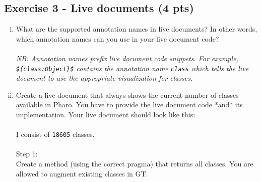 \documentclass [11pt, a4wide, twoside]{article}
\begin{document}
\subsection*{Exercise 3 - Live documents (4 pts)}
\begin{enumerate}[i)]
\item What are the supported annotation names in live documents? In other words, which annotation names can you use in your live document code?\\\\
\emph{NB: Annotation names prefix live document code snippets. For example, \texttt{\$\{class:Object\}\$} contains the annotation name \texttt{class} which tells the live document to use the appropriate visualization for classes.}
\item Create a live document that always shows the current number of classes available in Pharo. You have to provide the live document code *and* its implementation. Your live document should look like this:\\\\
I consist of \texttt{18605} classes.\\\\
Step 1:\\
Create a method (using the correct pragma) that returns all classes. You are allowed to augment existing classes in GT.\\\\

\end{enumerate}
\end{document}

